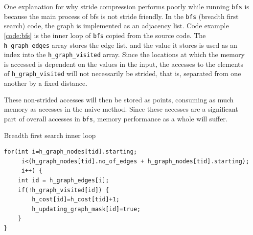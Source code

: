 \documentclass[12pt,twoside]{reedthesis}
\newenvironment{codeexample}[1][htb]
{\floatname{algorithm}{Code Example}%
	\begin{algorithm}[#1]%
	}{\end{algorithm}}
\begin{document}
%		
%		

		
		One explanation for why stride compression performs poorly while running \texttt{bfs} is because the main process of bfs is not stride friendly. In the \texttt{bfs} (breadth first search) code, the graph is implemented as an adjacency list. 
		Code example \ref{code:bfs} is the inner loop of \texttt{bfs} copied from the source code. The \texttt{h\_graph\_edges} array stores the edge list, and the value it stores is used as an index into the \texttt{h\_graph\_visited} array. Since the locations at which the memory is accessed is dependent on the values in the input, the accesses to the elements of \texttt{h\_graph\_visited} will not necessarily be strided, that is, separated from one another by a fixed distance. 
		
		These non-strided accesses will then be stored as points, consuming as much memory as accesses in the naive method. Since these accesses are a significant part of overall accesses in \texttt{bfs}, memory performance as a whole will suffer. 
		
\begin{codeexample}
	\caption{Breadth first search inner loop}
	\label{code:bfs}
		\begin{verbatim}
for(int i=h_graph_nodes[tid].starting; 
     i<(h_graph_nodes[tid].no_of_edges + h_graph_nodes[tid].starting); 
     i++) {
    int id = h_graph_edges[i];
    if(!h_graph_visited[id]) {
        h_cost[id]=h_cost[tid]+1;
        h_updating_graph_mask[id]=true;
    }
}
		\end{verbatim}
	\end{codeexample}
		
\end{document}
